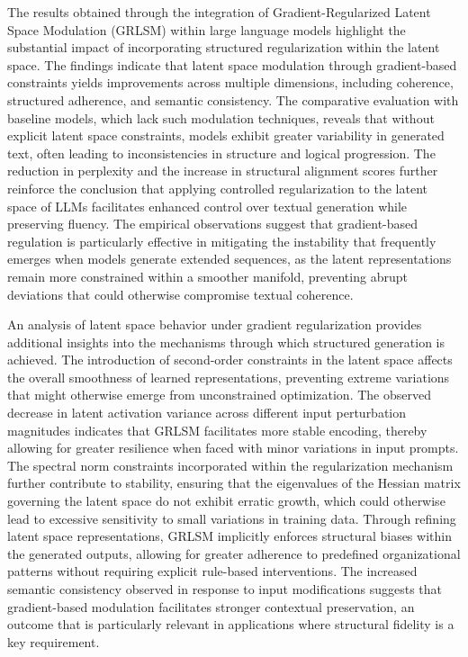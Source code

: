\documentclass{article}
\begin{document}
The results obtained through the integration of Gradient-Regularized Latent Space Modulation (GRLSM) within large language models highlight the substantial impact of incorporating structured regularization within the latent space. The findings indicate that latent space modulation through gradient-based constraints yields improvements across multiple dimensions, including coherence, structured adherence, and semantic consistency. The comparative evaluation with baseline models, which lack such modulation techniques, reveals that without explicit latent space constraints, models exhibit greater variability in generated text, often leading to inconsistencies in structure and logical progression. The reduction in perplexity and the increase in structural alignment scores further reinforce the conclusion that applying controlled regularization to the latent space of LLMs facilitates enhanced control over textual generation while preserving fluency. The empirical observations suggest that gradient-based regulation is particularly effective in mitigating the instability that frequently emerges when models generate extended sequences, as the latent representations remain more constrained within a smoother manifold, preventing abrupt deviations that could otherwise compromise textual coherence.

An analysis of latent space behavior under gradient regularization provides additional insights into the mechanisms through which structured generation is achieved. The introduction of second-order constraints in the latent space affects the overall smoothness of learned representations, preventing extreme variations that might otherwise emerge from unconstrained optimization. The observed decrease in latent activation variance across different input perturbation magnitudes indicates that GRLSM facilitates more stable encoding, thereby allowing for greater resilience when faced with minor variations in input prompts. The spectral norm constraints incorporated within the regularization mechanism further contribute to stability, ensuring that the eigenvalues of the Hessian matrix governing the latent space do not exhibit erratic growth, which could otherwise lead to excessive sensitivity to small variations in training data. Through refining latent space representations, GRLSM implicitly enforces structural biases within the generated outputs, allowing for greater adherence to predefined organizational patterns without requiring explicit rule-based interventions. The increased semantic consistency observed in response to input modifications suggests that gradient-based modulation facilitates stronger contextual preservation, an outcome that is particularly relevant in applications where structural fidelity is a key requirement.
\end{document}
